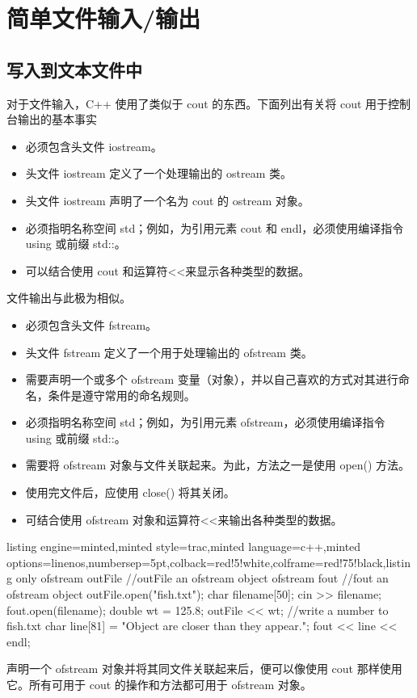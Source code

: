 \section{简单文件输入/输出}
\subsection{写入到文本文件中}
对于文件输入，C++ 使用了类似于 cout 的东西。下面列出有关将 cout 用于控制台输出的基本事实
\begin{itemize}
	\setlength{\itemsep}{0pt}
	\setlength{\parsep}{0pt}
	\setlength{\parskip}{0pt}
	\item 必须包含头文件 iostream。
	\item 头文件 iostream 定义了一个处理输出的 ostream 类。
	\item 头文件 iostream 声明了一个名为 cout 的 ostream 对象。
	\item 必须指明名称空间 std；例如，为引用元素 cout 和 endl，必须使用编译指令 using 或前缀 std::。
	\item 可以结合使用 cout 和运算符<<来显示各种类型的数据。
\end{itemize}
文件输出与此极为相似。
\begin{itemize}
	\setlength{\itemsep}{0pt}
	\setlength{\parsep}{0pt}
	\setlength{\parskip}{0pt}
	\item 必须包含头文件 fstream。
	\item 头文件 fstream 定义了一个用于处理输出的 ofstream 类。
	\item 需要声明一个或多个 ofstream 变量（对象），并以自己喜欢的方式对其进行命名，条件是遵守常用的命名规则。
	\item 必须指明名称空间 std；例如，为引用元素 ofstream，必须使用编译指令 using 或前缀 std::。
	\item 需要将 ofstream 对象与文件关联起来。为此，方法之一是使用 open() 方法。
	\item 使用完文件后，应使用 close() 将其关闭。
	\item 可结合使用 ofstream 对象和运算符<<来输出各种类型的数据。
\end{itemize}
\begin{tcblisting}{listing engine=minted,minted style=trac,minted language=c++,minted options={linenos,numbersep=5pt},colback=red!5!white,colframe=red!75!black,listing only}
	ofstream outFile  //outFile an ofstream object
	ofstream fout  //fout an ofstream object
	outFile.open("fish.txt");
	char filename[50];
	cin >> filename;
	fout.open(filename);
	double wt = 125.8;
	outFile << wt; //write a number to fish.txt
	char line[81] = "Object are closer than they appear.";
	fout << line << endl;
\end{tcblisting}
声明一个 ofstream 对象并将其同文件关联起来后，便可以像使用 cout 那样使用它。所有可用于 cout 的操作和方法都可用于 ofstream 对象。

